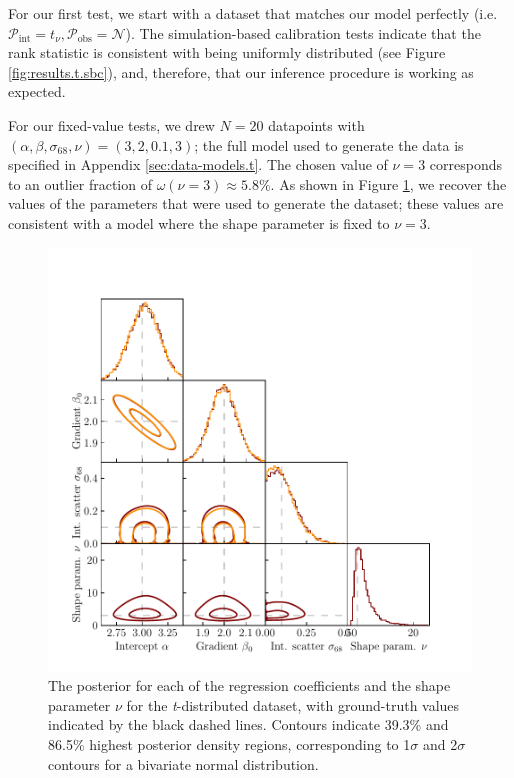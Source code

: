 \documentclass[fleqn,usenatbib]{rasti}
\begin{document}
For our first test, we start with a dataset that matches our model perfectly
(i.e.\ $\mathcal P_{\text{int}} = t_\nu, \mathcal P_{\text{obs}} = \mathcal{N}$).
The simulation-based calibration tests indicate that the rank statistic is
consistent with being uniformly distributed (see Figure
\ref{fig:results.t.sbc}), and, therefore, that our inference procedure is
working as expected.

For our fixed-value tests, we drew $N = 20$ datapoints with $(\alpha, \beta,
\sigma_{68}, \nu) = (3, 2, 0.1, 3)$; the full model used to generate the data is
specified in Appendix \ref{sec:data-models.t}. The chosen value of $\nu = 3$
corresponds to an outlier fraction of $\omega(\nu = 3) \approx 5.8 \%$.  As
shown in Figure \ref{fig:results.t.corner}, we recover the values of the
parameters that were used to generate the dataset; these values are consistent
with a model where the shape parameter is fixed to $\nu = 3$.

\begin{figure}
    \includegraphics[width=\columnwidth]{graphics/fixed/corner_t.pdf}
    \caption{The posterior for each of the regression coefficients and the shape
    parameter $\nu$ for the \textit{t}-distributed dataset, with ground-truth
    values indicated by the black dashed lines. Contours indicate 39.3\% and
    86.5\% highest posterior density regions, corresponding to 1$\sigma$ and
    2$\sigma$ contours for a bivariate normal distribution.}
    \label{fig:results.t.corner}
\end{figure}
\end{document}
